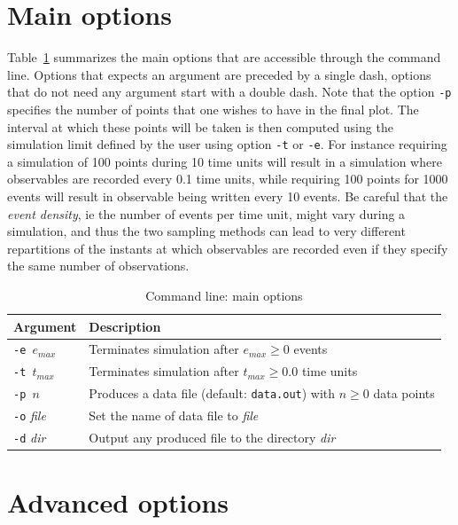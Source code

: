 \documentclass[11pt]{book}
\def\ttt#1{\texttt{#1}}
\def\ie{ie }
\def\mit#1{{\mathit #1}}
\begin{document}
\section{Main options}

Table~\ref{tab:options} summarizes the main options that are accessible through the command line. Options that expects an argument are preceded by a single dash, options that do not need any argument start with a double dash. Note that the option \ttt{-p} specifies the number of points that one wishes to have in the final plot. The interval at which these points will be taken is then computed using the simulation limit defined by the user using option \ttt{-t} or \ttt{-e}. For instance requiring a simulation of 100 points during 10 time units will result in a simulation where observables are recorded every 0.1 time units, while requiring 100 points for 1000 events will result in observable being written every 10 events. Be careful that the \emph{event density}, \ie the number of events per time unit, might vary during a simulation, and thus the two sampling methods can lead to very different repartitions of the instants at which observables are recorded even if they specify the same number of observations. 

\begin{table}[h!]
\caption{Command line: main options}
\begin{center}
\begin{tabular}{|l|l|}
\hline 
Argument & Description \\ \hline
\ttt{-e $e_{\mit{max}}$} & Terminates simulation after $e_{\mit{max}}\geq 0$ events\\
\ttt{-t $t_{\mit{max}}$} & Terminates simulation after $t_{\mit{max}}\geq 0.0$ time units\\
\ttt{-p $n$} & Produces a data file\index{data file} (default: \ttt{data.out}) with $n\geq 0$ data points\\
\ttt{-o} \textit{file} & Set the name of data file to \textit{file}\\ 
\ttt{-d} \textit{dir} & Output any produced file to the directory \textit{dir}\\
\hline
\end{tabular}
\end{center}
\label{tab:options}
\end{table}%

\section{Advanced options}
\end{document}
